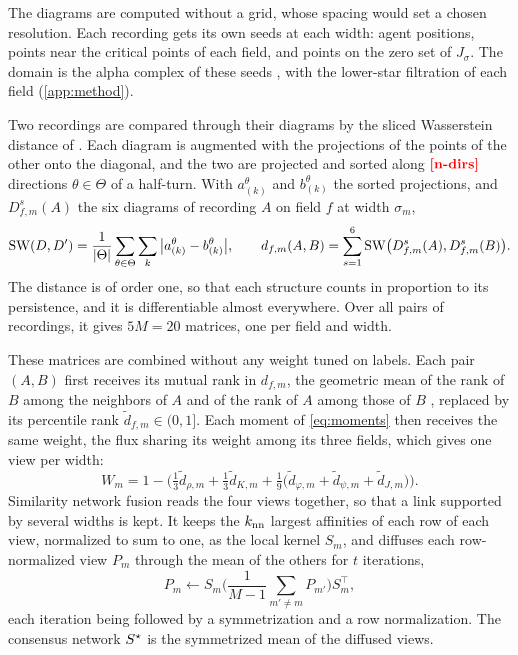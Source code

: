 \documentclass[pdflatex,sn-apa]{sn-jnl}
\begin{document}
The diagrams are computed without a grid, whose spacing would set a chosen resolution. Each
recording gets its own seeds at each width: agent positions, points near the critical points of each field, and points
on the zero set of $J_\sigma$. The domain is the alpha complex of these seeds
\citep{edelsbrunner2010computational,maria2014gudhi}, with the lower-star filtration of each field
(\cref{app:method}).

Two recordings are compared through their diagrams by the sliced Wasserstein distance of \citet{carriere2017sliced}.
Each diagram is augmented with the projections of the points of the other onto the diagonal, and the two are projected
and sorted along $\nm{n-dirs}$ directions $\theta\in\Theta$ of a half-turn. With $a^\theta_{(k)}$ and $b^\theta_{(k)}$
the sorted projections, and $D^s_{f,m}(A)$ the six diagrams of recording $A$ on field $f$ at width $\sigma_m$,
\begin{equation}
\mathrm{SW}(D,D')=\frac{1}{|\Theta|}\sum_{\theta\in\Theta}\sum_{k}\big|a^{\theta}_{(k)}-b^{\theta}_{(k)}\big|,\qquad
d_{f,m}(A,B)=\sum_{s=1}^{6}\mathrm{SW}\big(D^{s}_{f,m}(A),D^{s}_{f,m}(B)\big).
\label{eq:sw}
\end{equation}
The distance is of order one, so that each structure counts in proportion to its persistence, and it is differentiable
almost everywhere. Over all pairs of recordings, it gives $5M=20$ matrices, one per field and width.

These matrices are combined without any weight tuned on labels. Each pair $(A,B)$ first receives its mutual rank in
$d_{f,m}$, the geometric mean of the rank of $B$ among the neighbors of $A$ and of the rank of $A$ among those of $B$
\citep{obayashi2009rank}, replaced by its percentile rank $\tilde d_{f,m}\in(0,1]$. Each moment of \eqref{eq:moments}
then receives the same weight, the flux sharing its weight among its three fields, which gives one view per width:
\begin{equation}
W_m=1-\Big(\tfrac13\tilde d_{\rho,m}+\tfrac13\tilde d_{K,m}+\tfrac19\big(\tilde d_{\varphi,m}+\tilde d_{\psi,m}
+\tilde d_{J,m}\big)\Big).
\label{eq:view}
\end{equation}
Similarity network fusion \citep{wang2014similarity} reads the four views together, so that a link supported by
several widths is kept. It keeps the $k_{\mathrm{nn}}$ largest affinities of each row of each view, normalized to sum to one, as
the local kernel $S_m$, and diffuses each row-normalized view $P_m$ through the mean of the others for $t$ iterations,
\begin{equation}
P_m\leftarrow S_m\Big(\frac{1}{M-1}\sum_{m'\neq m}P_{m'}\Big)S_m^{\top},
\label{eq:snf}
\end{equation}
each iteration being followed by a symmetrization and a row normalization. The consensus network $S^{\star}$ is the
symmetrized mean of the diffused views.
\end{document}
